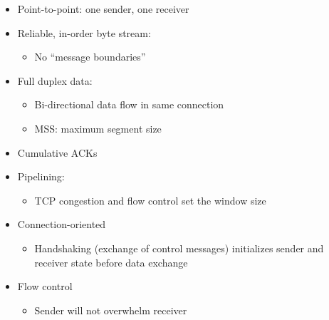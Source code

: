 \begin{itemize}
    \begin{itemize}

      \item Point-to-point: one sender, one receiver

      \item Reliable, in-order byte stream:

        \begin{itemize}

          \item No ``message boundaries''

        \end{itemize}

      \item Full duplex data:

        \begin{itemize}

          \item Bi-directional data flow in same connection

          \item MSS: maximum segment size

        \end{itemize}

      \item Cumulative ACKs

      \item Pipelining:

        \begin{itemize}

          \item TCP congestion and flow control set the window size

        \end{itemize}

      \item Connection-oriented

        \begin{itemize}

          \item Handshaking (exchange of control messages) initializes sender and receiver state before data exchange

        \end{itemize}

      \item Flow control

        \begin{itemize}

          \item Sender will not overwhelm receiver

        \end{itemize}

    \end{itemize}

\end{itemize}



